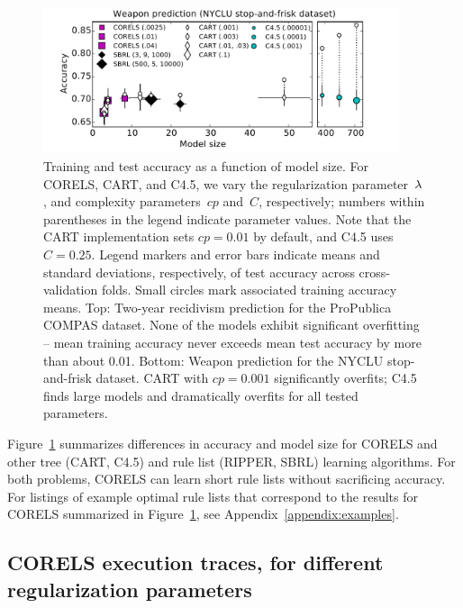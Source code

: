 \begin{figure}[t!]
\begin{center}
\includegraphics[trim={12mm, 0mm, 24mm, 0mm},
width=0.93\textwidth]{figs/frisk-sparsity-training-c45.pdf}
\end{center}
\caption{Training and test accuracy as a function of model size.
%
For CORELS, CART, and C4.5, we vary the regularization parameter~${\lambda}$,
and complexity parameters~$cp$ and~$C$, respectively;
numbers within parentheses in the legend indicate parameter values.
%
Note that the CART implementation sets ${cp = 0.01}$ by default,
and C4.5 uses ${C = 0.25}$.
%
Legend markers and error bars indicate means and standard deviations,
respectively, of test accuracy across cross-validation folds.
%
Small circles mark associated training accuracy means.
%
Top:  Two-year recidivism prediction for the ProPublica COMPAS dataset.
%
%
None of the models exhibit significant overfitting --
mean training accuracy never exceeds mean test accuracy
by more than about 0.01.
%
Bottom:  Weapon prediction for the NYCLU stop-and-frisk dataset.
%
%
CART with ${cp = 0.001}$ significantly overfits;
C4.5 finds large models and dramatically overfits for all tested parameters.
}
\label{fig:sparsity}
\end{figure}

Figure~\ref{fig:sparsity} summarizes differences in accuracy and model size
for CORELS and other tree (CART, C4.5) and rule list (RIPPER, SBRL) learning algorithms.
%
For both problems, CORELS can learn short rule lists without sacrificing accuracy.
%
For listings of example optimal rule lists that correspond to the results
for CORELS summarized in Figure~\ref{fig:sparsity}, see Appendix~\ref{appendix:examples}.

\subsection{CORELS execution traces, for different regularization parameters}
\label{sec:reg-param}

